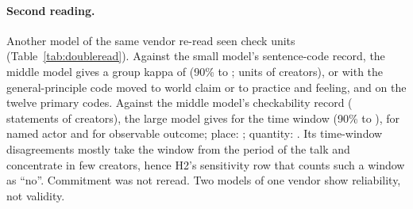 \paragraph{Second reading.} Another model of the same vendor re-read seen check units (Table~\ref{tab:doubleread}).
Against the small model's sentence-code record, the middle model gives a group kappa of \DblSGroup{} (90\% \DblSGroupLo{}
to \DblSGroupHi; \DblSUnits{} units of \DblSCreators{} creators), \DblSQTwoWorld{} or \DblSQTwoPractice{} with the
general-principle code moved to world claim or to practice and feeling, and \DblSPrimary{} on the twelve primary codes.
Against the middle model's checkability record (\DblFcUnits{} statements of \DblFcCreators{} creators), the large model
gives \DblFcTime{} for the time window (90\% \DblFcTimeLo{} to \DblFcTimeHi), \DblFcActor{} for named actor and
\DblFcOutcome{} for observable outcome; place: \DblFcPlace; quantity: \DblFcQuantity. Its time-window disagreements
mostly take the window from the period of the talk and concentrate in few creators, hence H2's sensitivity row that
counts such a window as ``no''. Commitment was not reread. Two models of one vendor show reliability, not validity.

